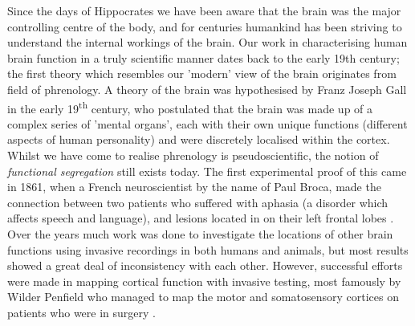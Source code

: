 Since the days of Hippocrates we have been aware that the brain was the major controlling centre of the body, and for centuries humankind has been striving to understand the internal workings of the brain. Our work in characterising human brain function in a truly scientific manner dates back to the early 19th century; the first theory which resembles our 'modern' view of the brain originates from field of phrenology. A theory of the brain was hypothesised by Franz Joseph Gall in the early 19\textsuperscript{th} century, who postulated that the brain was made up of a complex series of 'mental organs', each with their own unique functions (different aspects of human personality) and were discretely localised within the cortex. Whilst we have come to realise phrenology is pseudoscientific, the notion of \textit{functional segregation} still exists today. The first experimental proof of this came in 1861, when a French neuroscientist by the name of Paul Broca, made the connection between two patients who suffered with aphasia (a disorder which affects speech and language), and lesions located in on their left frontal lobes \citep{Broca1861}. Over the years much work was done to investigate the locations of other brain functions using invasive recordings in both humans and animals, but most results showed a great deal of inconsistency with each other. However, successful efforts were made in mapping cortical function with invasive testing, most famously by Wilder Penfield who managed to map the motor and somatosensory cortices on patients who were in surgery \citep{Penfield1954}.

